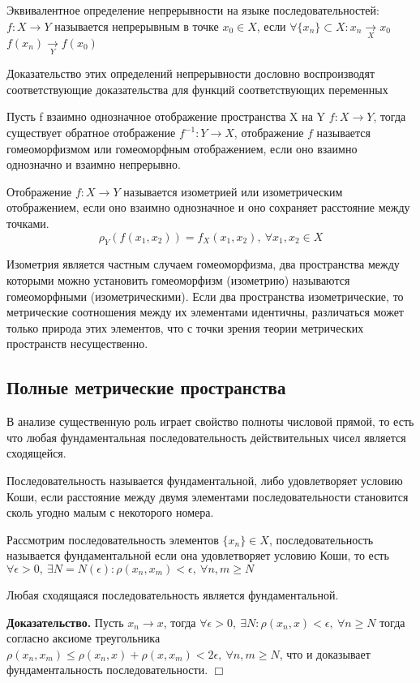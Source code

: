 \documentclass[14pt]{extarticle}
\theoremstyle{definition}
\theoremstyle{remark}
\renewcommand{\[}{\begin{dmath*}[compact]}
\renewcommand{\]}{\end{dmath*}}
\newcommand{\sep}{ , \ \allowbreak }
\newcommand{\btev}[1][]{\textbf{Доказательство#1.}
}
\newcommand{\etev}{$\Box$}
\begin{document}
Эквивалентное определение непрерывности на языке последовательностей:
$f: X \to Y$ называется непрерывным в точке $x_0 \in X$, если
$\forall \{x_n\}\subset X: x_n\xrightarrow[X]{} x_0$
$f(x_n) \xrightarrow[Y]{} f(x_0)$

Доказательство этих определений непрерывности дословно воспроизводят
соответствующие доказательства для функций соответствующих переменных

Пусть f взаимно однозначное отображение пространства X на Y
$f: X \to Y$, тогда существует обратное отображение
$f^{-1}: Y\to X$, отображение $f$ называется гомеоморфизмом или гомеоморфным
отображением, если оно взаимно однозначно и взаимно непрерывно.

Отображение $f: X \to Y$ называется изометрией или изометрическим
отображением, если оно взаимно однозначное и оно сохраняет расстояние между
точками.
\[ \rho_Y(f(x_1,x_2))=f_X(x_1,x_2) \sep {\forall x_1,x_2\in X}\]

Изометрия является частным случаем гомеоморфизма, два пространства между
которыми можно установить гомеоморфизм (изометрию) называются гомеоморфными
(изометрическими). Если два пространства изометрические, то метрические
соотношения между их элементами идентичны, различаться может только природа
этих элементов, что с точки зрения теории метрических пространств несущественно.

\subsection{Полные метрические пространства}

В анализе существенную роль играет свойство полноты числовой прямой, то есть
что любая фундаментальная последовательность действительных чисел является
сходящейся.

Последовательность называется фундаментальной, либо удовлетворяет условию Коши,
если расстояние между двумя элементами последовательности становится сколь
угодно малым с некоторого номера.

Рассмотрим последовательность элементов $\{x_n\} \in X$, последовательность
называется фундаментальной если она удовлетворяет условию Коши, то есть
$ \forall \epsilon > 0 \sep \exists N = N(\epsilon): \rho(x_n, x_m) < \epsilon
\sep \forall n, m \geq N $

Любая сходящаяся последовательность является фундаментальной.

\btev[] Пусть $x_n \to x$, тогда
$\forall \epsilon > 0 \sep \exists N: \rho(x_n, x) < \epsilon \sep
\forall n \geq N$
тогда согласно аксиоме треугольника
$\rho(x_n, x_m) \leq \rho(x_n, x)+\rho(x, x_m) < 2\epsilon \sep
\forall n, m \geq N$,
что и доказывает фундаментальность последовательности. \etev
\end{document}
